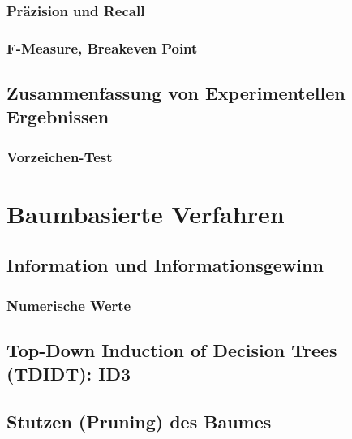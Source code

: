 		\subsection{Präzision und Recall} %

		\subsection{F-Measure, Breakeven Point} %

	\section{Zusammenfassung von Experimentellen Ergebnissen} %

		\subsection{Vorzeichen-Test} %

\chapter{Baumbasierte Verfahren} %
	\label{c:trees}


	\section{Information und Informationsgewinn} %

		\subsection{Numerische Werte} %

	\section{Top-Down Induction of Decision Trees (TDIDT): ID3} %

	\section{Stutzen (Pruning) des Baumes} %

